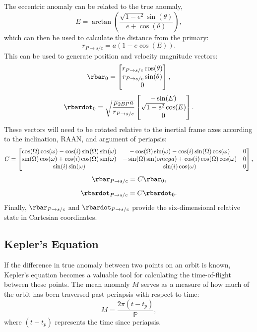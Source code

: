 The eccentric anomaly can be related to the true anomaly,
\begin{equation}
    E=\arctan(\frac{\sqrt{1-e^{2}}\sin(\theta)}{e+\cos(\theta)}),
    \label{eq:eccentricanomaly}
\end{equation}
which can then be used to calculate the distance from the primary:
\begin{equation}
    r_{P\rightarrow s/c}=a(1-e\cos(E)).
    \label{eq:circularradius}
\end{equation}
This can be used to generate position and velocity magnitude vectors:
\begin{equation}
    \rbar_{0}=\begin{bmatrix}r_{P\rightarrow s/c}\cos(\theta)\cr r_{P\rightarrow s/c}\sin(\theta)\cr0\end{bmatrix},
    \label{eq:circularpositionvector}
\end{equation}
\begin{equation}
    \rbardot_{0}=\sqrt{\frac{\mu_{2BP}a}{r_{P\rightarrow s/c}}}\begin{bmatrix}-\sin(E)\cr\sqrt{1-e^{2}}\cos(E)\cr0\end{bmatrix}.
    \label{eq:circularvelocityvector}
\end{equation}
These vectors will need to be rotated relative to the inertial frame axes according to the
inclination, RAAN, and argument of periapsis:
\begin{equation}
    C=\begin{bmatrix}\cos(\Omega)\cos(\omega)-\cos(i)\sin(\Omega)\sin(\omega)&-\cos(\Omega)\sin(\omega)-\cos(i)\sin(\Omega)\cos(\omega)&0\cr\sin(\Omega)\cos(\omega)+\cos(i)\cos(\Omega)\sin(\omega)&-\sin(\Omega)\sin(omega)+\cos(i)\cos(\Omega)\cos(\omega)&0\cr\sin(i)\sin(\omega)&\sin(i)\cos(\omega)&0\end{bmatrix},
    \label{eq:elementrotation}
\end{equation}
\begin{equation}
    \rbar_{P\rightarrow s/c}=C\rbar_{0},
    \label{eq:positionvector}
\end{equation}
\begin{equation}
    \rbardot_{P\rightarrow s/c}=C\rbardot_{0}.
    \label{eq:velocityvector}
\end{equation}
Finally, $\rbar_{P\rightarrow s/c}$ and $\rbardot_{P\rightarrow s/c}$ provide the six-dimensional
relative state in Cartesian coordinates.

\subsection{Kepler's Equation}
If the difference in true anomaly between two points on an orbit is known, Kepler's equation
becomes a valuable tool for calculating the time-of-flight between these points. The mean anomaly
$M$ serves as a measure of how much of the orbit has been traversed past periapsis with respect to
time:
\begin{equation}
    M=\frac{2\pi(t-t_{p})}{\mathbb{P}},
    \label{eq:meananomaly}
\end{equation}
where $(t-t_{p})$ represents the time since periapsis.

